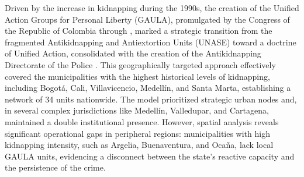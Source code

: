 \documentclass[ecta,nameyear,draft]{econsocart}
\theoremstyle{plain}
\theoremstyle{definition}
\newcommand{\1}{\mathbf{1}}
\begin{document}
Driven by the increase in kidnapping during the 1990s, the creation of the Unified Action Groups for Personal Liberty (GAULA), promulgated by the Congress of the Republic of Colombia through \citet{ley282_1996}, marked a strategic transition from the fragmented Antikidnapping and Antiextortion Units (UNASE) toward a doctrine of Unified Action, consolidated with the creation of the Antikidnapping Directorate of the Police \citet{decreto864_1998}. This geographically targeted approach effectively covered the municipalities with the highest historical levels of kidnapping, including Bogotá, Cali, Villavicencio, Medellín, and Santa Marta, establishing a network of 34 units nationwide. The model prioritized strategic urban nodes and, in several complex jurisdictions like Medellín, Valledupar, and Cartagena, maintained a double institutional presence. However, spatial analysis reveals significant operational gaps in peripheral regions: municipalities with high kidnapping intensity, such as Argelia, Buenaventura, and Ocaña, lack local GAULA units, evidencing a disconnect between the state's reactive capacity and the persistence of the crime.
\end{document}
